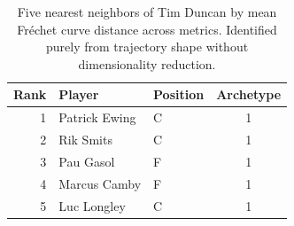 \begin{table}[htbp]
  \centering\small
  \begin{tabular}{rllc}
    \toprule
    Rank & Player & Position & Archetype \\
    \midrule
    1 & Patrick Ewing & C & 1 \\
    2 & Rik Smits & C & 1 \\
    3 & Pau Gasol & F & 1 \\
    4 & Marcus Camby & F & 1 \\
    5 & Luc Longley & C & 1 \\
    \bottomrule
  \end{tabular}
  \caption{Five nearest neighbors of Tim Duncan by mean Fr\'{e}chet curve distance across metrics. Identified purely from trajectory shape without dimensionality reduction.}
  \label{tab:Tim_Duncan_frechet_curve_neighbors}
\end{table}

